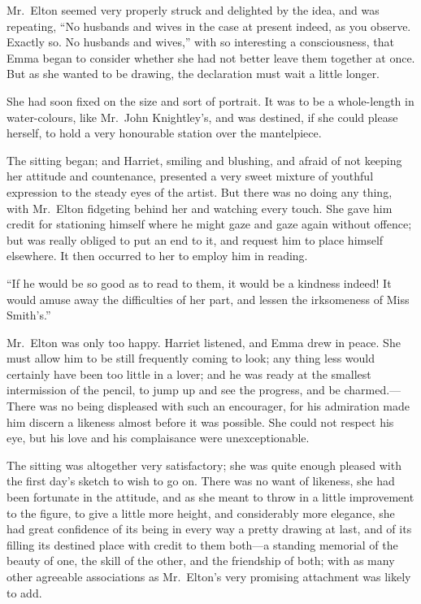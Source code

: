 Mr.\ Elton seemed very properly struck and delighted by the idea,
and was repeating, ``No husbands and wives in the case at present
indeed, as you observe.  Exactly so.  No husbands and wives,''
with so interesting a consciousness, that Emma began to consider
whether she had not better leave them together at once.  But as she
wanted to be drawing, the declaration must wait a little longer.

She had soon fixed on the size and sort of portrait.
It was to be a whole-length in water-colours, like Mr.\ John
Knightley's, and was destined, if she could please herself,
to hold a very honourable station over the mantelpiece.

The sitting began; and Harriet, smiling and blushing, and afraid
of not keeping her attitude and countenance, presented a very sweet
mixture of youthful expression to the steady eyes of the artist.
But there was no doing any thing, with Mr.\ Elton fidgeting behind
her and watching every touch.  She gave him credit for stationing
himself where he might gaze and gaze again without offence;
but was really obliged to put an end to it, and request him to
place himself elsewhere.  It then occurred to her to employ him
in reading.

``If he would be so good as to read to them, it would be a kindness
indeed! It would amuse away the difficulties of her part, and lessen
the irksomeness of Miss Smith's.''

Mr.\ Elton was only too happy.  Harriet listened, and Emma drew
in peace.  She must allow him to be still frequently coming to look;
any thing less would certainly have been too little in a lover;
and he was ready at the smallest intermission of the pencil,
to jump up and see the progress, and be charmed.---There was no
being displeased with such an encourager, for his admiration
made him discern a likeness almost before it was possible.
She could not respect his eye, but his love and his complaisance
were unexceptionable.

The sitting was altogether very satisfactory; she was quite
enough pleased with the first day's sketch to wish to go on.
There was no want of likeness, she had been fortunate in the attitude,
and as she meant to throw in a little improvement to the figure,
to give a little more height, and considerably more elegance, she had
great confidence of its being in every way a pretty drawing at last,
and of its filling its destined place with credit to them both---a
standing memorial of the beauty of one, the skill of the other,
and the friendship of both; with as many other agreeable associations
as Mr.\ Elton's very promising attachment was likely to add.

